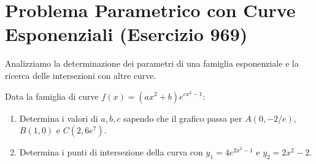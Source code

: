 \documentclass[11pt,a4paper,oneside]{report}
\begin{document}
\section{Problema Parametrico con Curve Esponenziali (Esercizio 969)}
Analizziamo la determinazione dei parametri di una famiglia esponenziale e la ricerca delle intersezioni con altre curve.

\begin{esercizio}
Data la famiglia di curve $f(x) = (ax^2 + b)e^{cx^2 - 1}$:
\begin{enumerate}[label=\alph*.]
    \item Determina i valori di $a, b, c$ sapendo che il grafico passa per $A(0, -2/e)$, $B(1, 0)$ e $C(2, 6e^7)$.
    \item Determina i punti di intersezione della curva con $y_1 = 4e^{2x^2 - 1}$ e $y_2 = 2x^2 - 2$.
\end{enumerate}
\end{esercizio}
\end{document}
